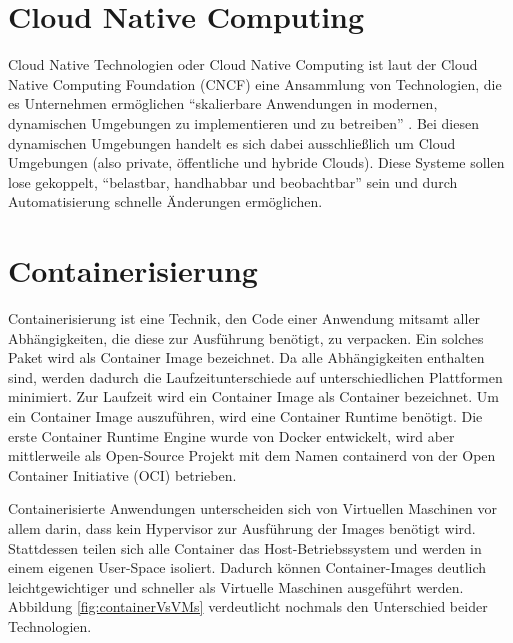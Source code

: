 \section{Cloud Native Computing}
Cloud Native Technologien oder Cloud Native Computing ist laut der Cloud Native Computing Foundation (CNCF) eine Ansammlung von Technologien, die es Unternehmen ermöglichen "`skalierbare Anwendungen in modernen, dynamischen Umgebungen zu implementieren und zu betreiben"' \cite{noauthor_cncftoc_nodate}. Bei diesen dynamischen Umgebungen handelt es sich dabei ausschließlich um Cloud Umgebungen (also private, öffentliche und hybride Clouds). Diese Systeme sollen lose gekoppelt, "`belastbar, handhabbar und beobachtbar"' sein und durch Automatisierung schnelle Änderungen ermöglichen\cite{noauthor_cncftoc_nodate}.

\section{Containerisierung}
Containerisierung ist eine Technik, den Code einer Anwendung mitsamt aller Abhängigkeiten, die diese zur Ausführung benötigt, zu verpacken. Ein solches Paket wird als Container Image bezeichnet. Da alle Abhängigkeiten enthalten sind, werden dadurch die Laufzeitunterschiede auf unterschiedlichen Plattformen minimiert\cite{noauthor_what_nodate}. Zur Laufzeit wird ein Container Image als Container bezeichnet. Um ein Container Image auszuführen, wird eine Container Runtime benötigt. Die erste Container Runtime Engine wurde von Docker entwickelt, wird aber mittlerweile als Open-Source Projekt mit dem Namen containerd von der Open Container Initiative (OCI) betrieben\cite{noauthor_what_nodate}. 

Containerisierte Anwendungen unterscheiden sich von Virtuellen Maschinen vor allem darin, dass kein Hypervisor zur Ausführung der Images benötigt wird. Stattdessen teilen sich alle Container das Host-Betriebssystem und werden in einem eigenen User-Space isoliert. Dadurch können Container-Images deutlich leichtgewichtiger und schneller als Virtuelle Maschinen ausgeführt werden. Abbildung \ref{fig:containerVsVMs} verdeutlicht nochmals den Unterschied beider Technologien.

